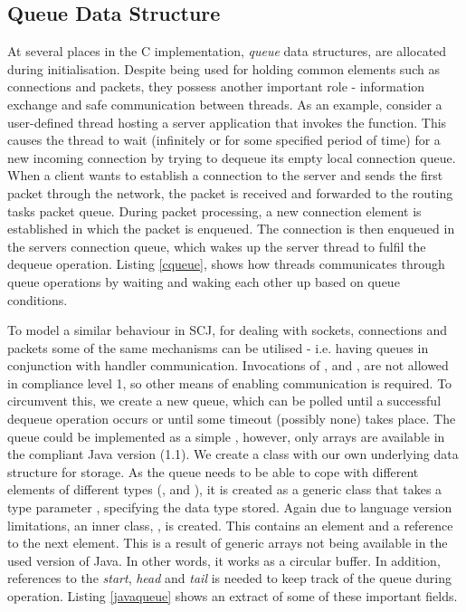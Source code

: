 \subsection{Queue Data Structure} %
\label{sub:queue}
At several places in the C implementation, \textit{queue} data structures, are allocated during initialisation. Despite being used for holding common elements such as connections and packets, they possess another important role - information exchange and safe communication between threads. As an example, consider a user-defined thread hosting a server application that invokes the  function. This causes the thread to wait (infinitely or for some specified period of time) for a new incoming connection by trying to dequeue its empty local connection queue. When a client wants to establish a connection to the server and sends the first packet through the network, the packet is received and forwarded to the routing tasks packet queue. During packet processing, a new connection element is established in which the packet is enqueued. The connection is then enqueued in the servers connection queue, which wakes up the server thread to fulfil the dequeue operation. Listing \ref{cqueue}, shows how threads communicates through queue operations by waiting and waking each other up based on queue conditions.



To model a similar behaviour in SCJ, for dealing with sockets, connections and packets some of the same mechanisms can be utilised - i.e. having queues in conjunction with handler communication. Invocations of ,  and , are not allowed in compliance level 1, so other means of enabling communication is required. To circumvent this, we create a new queue, which can be polled until a successful dequeue operation occurs or until some timeout (possibly none) takes place. The queue could be implemented as a simple , however, only arrays are available in the compliant Java version (1.1). We create a  class with our own underlying data structure for storage. As the queue needs to be able to cope with different elements of different types (,  and ), it is created as a generic class that takes a type parameter , specifying the data type stored. Again due to language version limitations, an inner class, , is created. This contains an element and a reference to the next element. This is a result of generic arrays not being available in the used version of Java. In other words, it works as a circular buffer. In addition, references to the \textit{start}, \textit{head} and \textit{tail} is needed to keep track of the queue during operation. Listing \ref{javaqueue} shows an extract of some of these important fields.

